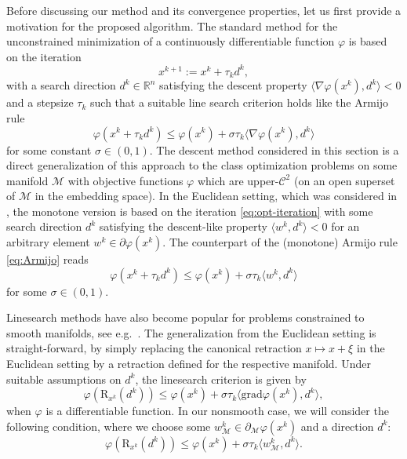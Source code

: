 \documentclass[a4paper, 12pt]{article}
\numberwithin{equation}{section}
\theoremstyle{bolddef}
\theoremstyle{definition}
\theoremstyle{boldplain}
\newcommand{\xk}{x^k}
\newcommand{\wk}{w^k}
\newcommand{\dk}{d^k}
\newcommand{\xkp}{x^{k+1}}
\newcommand{\grad}{\mathrm{grad}}
\newcommand{\retr}{\mathrm{R}}
\begin{document}
Before discussing our method and its convergence properties, let us first provide a motivation for the proposed algorithm. The standard method for the unconstrained minimization of a continuously differentiable 
function $ \varphi $ is based on the iteration
\begin{equation}\label{eq:opt-iteration}
	\xkp := \xk + \tau_k \dk, 
\end{equation}
with a search direction $ \dk \in \mathbb{R}^n $ satisfying the descent
property $ \langle \nabla \varphi (\xk), \dk \rangle < 0 $ and a 
stepsize $ \tau_k $ such that a suitable line search criterion holds
like the Armijo rule 
\begin{equation}\label{eq:Armijo}
	\varphi (\xk + \tau_k \dk) \leq \varphi (\xk) + \sigma \tau_k
	\langle \nabla \varphi (\xk), \dk \rangle
\end{equation}
for some constant $ \sigma \in (0,1) $. The descent method considered 
in this section is a direct generalization of this approach to the class
optimization problems on some manifold $\mathcal{M}$ with objective functions $ \varphi $ which are upper-$\mathcal{C}^2$ (on an open superset of $\mathcal{M}$ in the embedding space). 
In the Euclidean setting, which was considered in \cite{aragon2025}, the
monotone version is based on the iteration \eqref{eq:opt-iteration}
with some search direction $ d^k $ satisfying the descent-like property
$ \langle \wk, \dk \rangle < 0 $ for an arbitrary element $ \wk \in 
\partial \varphi (\xk) $. The counterpart of the (monotone) Armijo rule 
\eqref{eq:Armijo} reads
\begin{equation*}
	\varphi (\xk + \tau_k \dk) \leq \varphi (\xk) + \sigma \tau_k
	\langle \wk, \dk \rangle
\end{equation*}
for some $ \sigma \in (0,1) $. 

Linesearch methods have also become popular for problems constrained to smooth manifolds, see e.g.\ \cite{Absil2008,Boumal2018,Oviedo2022}. The generalization from the Euclidean setting is straight-forward, by simply replacing the canonical retraction $x \mapsto x+\xi$ in the Euclidean setting by a retraction defined for the respective manifold. Under suitable assumptions on $\dk$, the linesearch criterion is given by 
\begin{equation*}
	\varphi(\retr_{\xk} (\dk))\leq \varphi(\xk) + \sigma \tau_k \langle \grad \varphi(\xk), \dk\rangle,
\end{equation*}
when $\varphi$ is a differentiable function. In our nonsmooth case, we will consider the following condition, where we choose some $w_\mathcal{M}^k \in \partial_\mathcal{M} \varphi(\xk)$ and a direction $\dk$:
\begin{equation*}
	\varphi(\retr_{\xk} (\dk))\leq \varphi(\xk) + \sigma \tau_k \langle w^k_\mathcal{M}, \dk\rangle.
\end{equation*}
\end{document}
